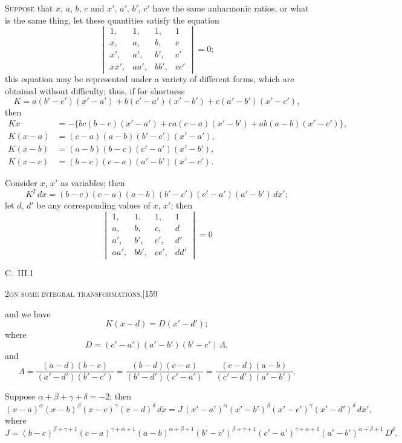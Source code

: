 \documentclass[11pt]{article}
\begin{document}
\textsc{Suppose} that $x$, $a$, $b$, $c$ and $x'$, $a'$, $b'$, $c'$ have the same anharmonic ratios, or what
is the same thing, let these quantities satisfy the equation
\[
\begin{vmatrix}
1, & 1, & 1, & 1\\
x, & a, & b, & c\\
x', & a', & b', & c'\\
xx', & aa', & bb', & cc'
\end{vmatrix} = 0;
\]
this equation may be represented under a variety of different forms, which are obtained
without difficulty; thus, if for shortness
\[
K = a(b'-c')(x'-a') + b(c'-a')(x'-b') + c(a'-b')(x'-c'),
\]
then
\begin{align*}
Kx &= -\{bc(b-c)(x'-a') + ca(c-a)(x'-b') + ab(a-b)(x'-c')\},\\
K(x-a) &= (c-a)(a-b)(b'-c')(x'-a'),\\
K(x-b) &= (a-b)(b-c)(c'-a')(x'-b'),\\
K(x-c) &= (b-c)(c-a)(a'-b')(x'-c').
\end{align*}

Consider $x$, $x'$ as variables; then
\[
K^{2}\, dx = (b-c)(c-a)(a-b)(b'-c')(c'-a')(a'-b')\, dx';
\]
let $d$, $d'$ be any corresponding values of $x$, $x'$; then
\[
\begin{vmatrix}
1, & 1, & 1, & 1\\
a, & b, & c, & d\\
a', & b', & c', & d'\\
aa', & bb', & cc', & dd'
\end{vmatrix} = 0
\]

\vspace{1em}
\noindent\hfill C.\ III.\hfill 1
\newpage

\begin{center}
\small\textsc{2}\hfill\textsc{on some integral transformations.}\hfill[159
\end{center}

\medskip

\noindent and we have
\[
K(x-d) = D(x'-d');
\]
where
\[
D = (c'-a')(a'-b')(b'-c')\,\Lambda,
\]
and
\[
\Lambda = \frac{(a-d)(b-c)}{(a'-d')(b'-c')} = \frac{(b-d)(c-a)}{(b'-d')(c'-a')} = \frac{(c-d)(a-b)}{(c'-d')(a'-b')}.
\]

Suppose $\alpha+\beta+\gamma+\delta = -2$; then
\[
(x-a)^{\alpha}(x-b)^{\beta}(x-c)^{\gamma}(x-d)^{\delta}\, dx
= J\,(x'-a')^{\alpha}(x'-b')^{\beta}(x'-c')^{\gamma}(x'-d')^{\delta}\, dx',
\]
where
\[
J = (b-c)^{\beta+\gamma+1}(c-a)^{\gamma+\alpha+1}(a-b)^{\alpha+\beta+1}(b'-c')^{\beta+\gamma+1}(c'-a')^{\gamma+\alpha+1}(a'-b')^{\alpha+\beta+1}\, D^{\delta}.
\]
\end{document}
